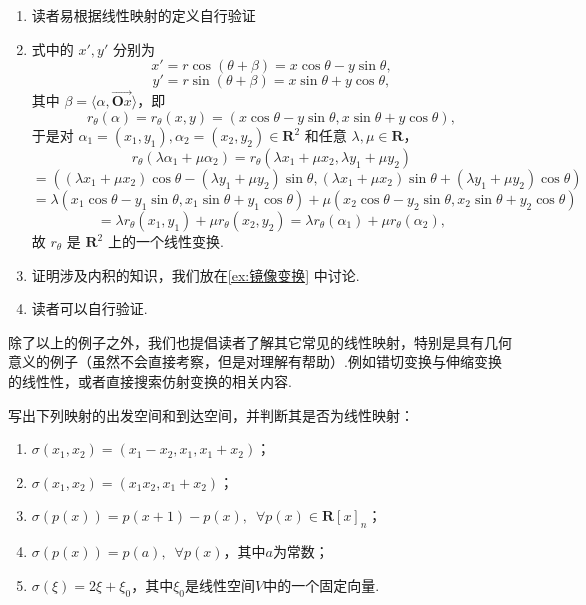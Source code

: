 \begin{solution}
    \begin{enumerate}
     \item 读者易根据线性映射的定义自行验证
     \item 式中的 \( x', y' \) 分别为
     \[
     x' = r \cos(\theta + \beta) = x \cos \theta - y \sin \theta,
     \]
     \[
     y' = r \sin(\theta + \beta) = x \sin \theta + y \cos \theta,
     \]
     其中 \( \beta = \langle \alpha, \vec{\mathbf{O}x} \rangle \)，即
     \[
     r_{\theta}(\alpha) = r_{\theta}(x, y) = (x \cos \theta - y \sin \theta, x \sin \theta + y \cos \theta),
     \]
     于是对 \( \alpha_1 = (x_1, y_1), \alpha_2 = (x_2, y_2) \in \mathbf{R}^2 \) 和任意 \( \lambda, \mu \in \mathbf{R} \)，
     \[
     r_{\theta}(\lambda \alpha_1 + \mu \alpha_2) = r_{\theta}(\lambda x_1 + \mu x_2, \lambda y_1 + \mu y_2)
     \]
     \[
     = ((\lambda x_1 + \mu x_2) \cos \theta - (\lambda y_1 + \mu y_2) \sin \theta,
     (\lambda x_1 + \mu x_2) \sin \theta + (\lambda y_1 + \mu y_2) \cos \theta)
     \]
     \[
     = \lambda (x_1 \cos \theta - y_1 \sin \theta, x_1 \sin \theta + y_1 \cos \theta)
     + \mu (x_2 \cos \theta - y_2 \sin \theta, x_2 \sin \theta + y_2 \cos \theta)
     \]
     \[
     = \lambda r_{\theta}(x_1, y_1) + \mu r_{\theta}(x_2, y_2) = \lambda r_{\theta}(\alpha_1) + \mu r_{\theta}(\alpha_2),
     \]
     故 \( r_{\theta} \) 是 \( \mathbf{R}^2 \) 上的一个线性变换.

    \item 证明涉及内积的知识，我们放在\autoref{ex:镜像变换} 中讨论.
    \item 读者可以自行验证.
    \end{enumerate}

\end{solution}

除了以上的例子之外，我们也提倡读者了解其它常见的线性映射，特别是具有几何意义的例子（虽然不会直接考察，但是对理解有帮助）.例如错切变换与伸缩变换的线性性，或者直接搜索仿射变换的相关内容.

\begin{example}{}{}
    写出下列映射的出发空间和到达空间，并判断其是否为线性映射：
    \begin{enumerate}
        \item $\sigma(x_1,x_2)=(x_1-x_2,x_1,x_1+x_2)$；

        \item $\sigma(x_1,x_2)=(x_1x_2,x_1+x_2)$；

        \item $\sigma(p(x))=p(x+1)-p(x),\enspace\forall p(x) \in \mathbf{R}[x]_n$；

        \item $\sigma(p(x))=p(a),\enspace\forall p(x)$，其中$a$为常数；

        \item $\sigma(\xi)=2\xi+\xi_0$，其中$\xi_0$是线性空间$V$中的一个固定向量.
    \end{enumerate}
\end{example}

